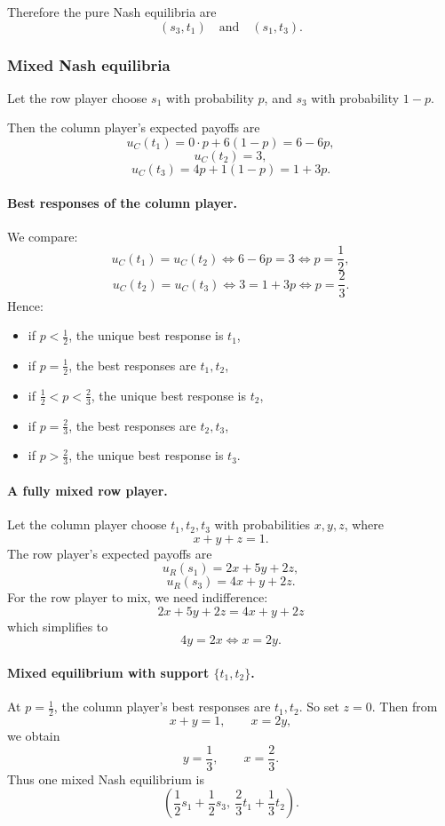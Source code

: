 Therefore the pure Nash equilibria are
\[
\boxed{(s_3,t_1)\quad \text{and}\quad (s_1,t_3).}
\]

\subsubsection*{Mixed Nash equilibria}

Let the row player choose \(s_1\) with probability \(p\), and \(s_3\) with probability \(1-p\).

Then the column player's expected payoffs are
\[
u_C(t_1)=0\cdot p+6(1-p)=6-6p,
\]
\[
u_C(t_2)=3,
\]
\[
u_C(t_3)=4p+1(1-p)=1+3p.
\]

\paragraph{Best responses of the column player.}
We compare:
\[
u_C(t_1)=u_C(t_2) \iff 6-6p=3 \iff p=\frac12,
\]
\[
u_C(t_2)=u_C(t_3) \iff 3=1+3p \iff p=\frac23.
\]
Hence:
\begin{itemize}
\item if \(p<\frac12\), the unique best response is \(t_1\),
\item if \(p=\frac12\), the best responses are \(t_1,t_2\),
\item if \(\frac12<p<\frac23\), the unique best response is \(t_2\),
\item if \(p=\frac23\), the best responses are \(t_2,t_3\),
\item if \(p>\frac23\), the unique best response is \(t_3\).
\end{itemize}

\paragraph{A fully mixed row player.}
Let the column player choose \(t_1,t_2,t_3\) with probabilities \(x,y,z\), where
\[
x+y+z=1.
\]
The row player's expected payoffs are
\[
u_R(s_1)=2x+5y+2z,
\]
\[
u_R(s_3)=4x+y+2z.
\]
For the row player to mix, we need indifference:
\[
2x+5y+2z=4x+y+2z
\]
which simplifies to
\[
4y=2x \iff x=2y. \tag{1}
\]

\paragraph{Mixed equilibrium with support \(\{t_1,t_2\}\).}
At \(p=\frac12\), the column player's best responses are \(t_1,t_2\). So set \(z=0\). Then from
\[
x+y=1,\qquad x=2y,
\]
we obtain
\[
y=\frac13,\qquad x=\frac23.
\]
Thus one mixed Nash equilibrium is
\[
\boxed{\left(\frac12 s_1+\frac12 s_3,\ \frac23 t_1+\frac13 t_2\right).}
\]

